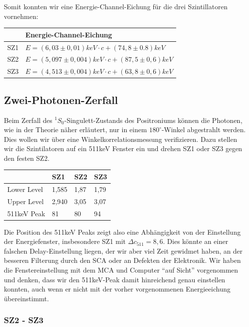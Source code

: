 Somit konnten wir eine Energie-Channel-Eichung für die drei Szintillatoren vornehmen:
\begin{center}
\begin{tabular}{ll}
\toprule
     & Energie-Channel-Eichung\\
\midrule
 SZ1 & $E = (6,03 \pm 0,01) keV \cdot c + (74,8 \pm 0.8) keV$\\
 SZ2 & $E = (5,097 \pm 0,004) keV \cdot c + (87,5 \pm 0,6) keV$\\
 SZ3 & $E = (4,513 \pm 0,004) keV \cdot c + (63,8 \pm 0,6) keV$\\
\bottomrule 
\end{tabular}
\end{center}

\subsection{Zwei-Photonen-Zerfall}

Beim Zerfall des $^1S_0$-Singulett-Zustands des Positroniums können die Photonen, wie in der Theorie näher erläutert, nur in einem $180^\circ$-Winkel abgestrahlt werden. Dies wollen wir über eine Winkelkorrelationsmessung verifizieren. Dazu stellen wir die Szintilatoren auf ein 511keV Fenster ein und drehen SZ1 oder SZ3 gegen den festen SZ2. 

\begin{center}
\begin{tabular}{llll}
\toprule
 & SZ1 & SZ2 & SZ3\\
\midrule
Lower Level & 1,585 & 1,87 & 1,79\\
Upper Level & 2,940 & 3,05 & 3,07\\
511keV Peak & 81  & 80 & 94\\
\bottomrule
\end{tabular}
\end{center}

Die Position des 511keV Peaks zeigt also eine Abhängigkeit von der Einstellung der Energiefenster, insbesondere SZ1 mit $\Delta c_{511} = 8,6$. Dies könnte an einer falschen Delay-Einstellung liegen, der wir aber viel Zeit gewidmet haben, an der besseren Filterung durch den SCA oder an Defekten der Elektronik. Wir haben die Fenstereinstellung mit dem MCA und Computer "`auf Sicht"' vorgenommen und denken, dass wir den 511keV-Peak damit hinreichend genau einstellen konnten, auch wenn er nicht mit der vorher vorgenommenen Energieeichung übereinstimmt.

\subsubsection{SZ2 - SZ3}

